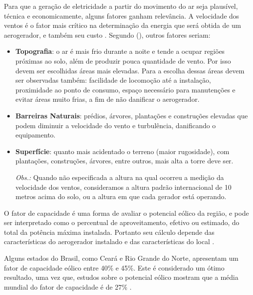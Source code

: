     Para que a geração de eletricidade a partir do movimento do ar seja plausível, técnica e economicamente, alguns fatores
    ganham relevância. A velocidade dos ventos é o fator mais crítico na determinação da energia que será obtida de um
    aerogerador, e também seu custo \cite{terciote02}. Segundo \citeauthor{terciote02} (\citeyear{terciote02}), outros fatores seriam:
    \begin{itemize}
     \item \textbf{Topografia}: o ar é mais frio durante a noite e tende a ocupar regiões próximas ao solo, além de produzir
	pouca quantidade de vento. Por isso devem ser escolhidas áreas mais elevadas. Para a escolha dessas áreas devem ser
	observadas também: facilidade de locomoção até a instalação, proximidade ao ponto de consumo, espaço necessário
	para manutenções e evitar áreas muito frias, a fim de não danificar o aerogerador.
	
     \item \textbf{Barreiras Naturais}: prédios, árvores, plantações e construções elevadas que podem diminuir
	a velocidade do vento e turbulência, danificando o equipamento.
      
     \item \textbf{Superfície}: quanto mais acidentado o terreno (maior rugosidade), com plantações, construções, árvores, entre outros,
	mais alta a torre deve ser.
      
     \textit{Obs.:} Quando não especificada a altura na qual ocorreu a medição da velocidade dos ventos,
	consideramos a altura padrão internacional de 10 metros acima do solo, ou a altura em que cada gerador está operando. 
     
    \end{itemize}
    
    O fator de capacidade é uma forma de avaliar o potencial eólico da região, e pode ser interpretado como o percentual 
    de aproveitamento, efetivo ou estimado, do total da potência máxima instalada. Portanto seu cálculo depende das 
    características do aerogerador instalado e das características do local \cite{amaral12}.
    
    Alguns estados do Brasil, como Ceará e Rio Grande do Norte, apresentam um fator de capacidade eólico entre 40\% e 45\%.
    Este é considerado um ótimo resultado, uma vez que, estudos sobre o potencial eólico mostram que a média mundial do fator
    de capacidade é de 27\% \cite{amaral12}.
    
    \nocite{cbee}
